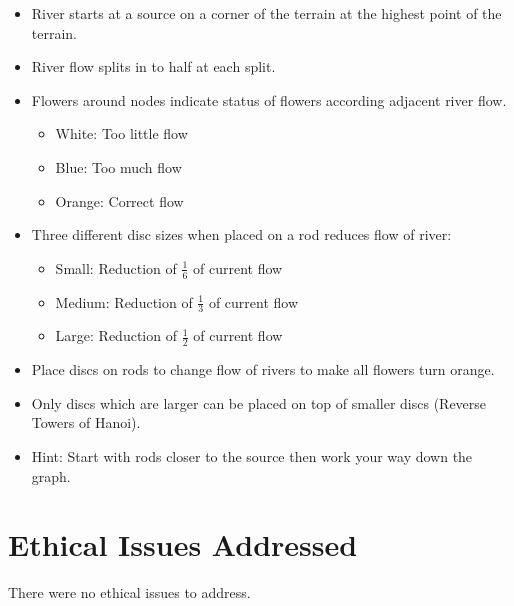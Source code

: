 \begin{appendices}
\begin{itemize}
	\item River starts at a source on a corner of the terrain at the highest point of the terrain.
	\item River flow splits in to half at each split.
	\item Flowers around nodes indicate status of flowers according adjacent river flow.
	\begin{itemize}
		\item White: Too little flow
		\item Blue: Too much flow
		\item Orange: Correct flow
	\end{itemize}
	\item Three different disc sizes when placed on a rod reduces flow of river:
	\begin{itemize}
		\item Small: Reduction of \(\frac{1}{6}\) of current flow
		\item Medium: Reduction of \(\frac{1}{3}\) of current flow
		\item Large: Reduction of \(\frac{1}{2}\) of current flow
	\end{itemize}
	\item Place discs on rods to change flow of rivers to make all flowers turn orange.
	\item Only discs which are larger can be placed on top of smaller discs (Reverse Towers of Hanoi).
	\item Hint: Start with rods closer to the source then work your way down the graph.
\end{itemize}
\chapter{Ethical Issues Addressed}
There were no ethical issues to address.
\end{appendices}